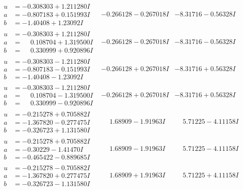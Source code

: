 \documentclass[1p]{elsarticle_modified}
\theoremstyle{definition}
\begin{document}
$$\begin{array}{c|c|c}
\begin{aligned}
u &= -0.308303 + 1.211280 I \\
a &= -0.807183 + 0.151993 I \\
b &= -1.40408 + 1.23092 I\end{aligned}
 & -0.266128 - 0.267018 I & -8.31716 - 0.56328 I \\ \hline\begin{aligned}
u &= -0.308303 + 1.211280 I \\
a &= \phantom{-}0.108704 + 1.319500 I \\
b &= \phantom{-}0.330999 + 0.920896 I\end{aligned}
 & -0.266128 - 0.267018 I & -8.31716 - 0.56328 I \\ \hline\begin{aligned}
u &= -0.308303 - 1.211280 I \\
a &= -0.807183 - 0.151993 I \\
b &= -1.40408 - 1.23092 I\end{aligned}
 & -0.266128 + 0.267018 I & -8.31716 + 0.56328 I \\ \hline\begin{aligned}
u &= -0.308303 - 1.211280 I \\
a &= \phantom{-}0.108704 - 1.319500 I \\
b &= \phantom{-}0.330999 - 0.920896 I\end{aligned}
 & -0.266128 + 0.267018 I & -8.31716 + 0.56328 I \\ \hline\begin{aligned}
u &= -0.215278 + 0.705882 I \\
a &= -1.367820 - 0.277475 I \\
b &= -0.326723 + 1.131580 I\end{aligned}
 & \phantom{-}1.68909 - 1.91963 I & \phantom{-}5.71225 - 4.11158 I \\ \hline\begin{aligned}
u &= -0.215278 + 0.705882 I \\
a &= -0.30229 - 1.41470 I \\
b &= -0.465422 - 0.889685 I\end{aligned}
 & \phantom{-}1.68909 - 1.91963 I & \phantom{-}5.71225 - 4.11158 I \\ \hline\begin{aligned}
u &= -0.215278 - 0.705882 I \\
a &= -1.367820 + 0.277475 I \\
b &= -0.326723 - 1.131580 I\end{aligned}
 & \phantom{-}1.68909 + 1.91963 I & \phantom{-}5.71225 + 4.11158 I \\ \hline\begin{aligned}

\end{aligned}
\end{array}$$
\end{document}

